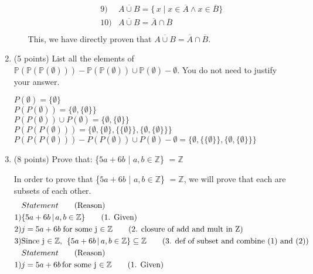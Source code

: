 \documentclass[11pt]{article}
\newcommand{\pt}[1]{\textcolor{maincolor}{(#1 points)}}
\begin{document}
\begin{justify}
\begin{enumerate}
\begin{enumerate}
\begin{mdframed}
\begin{align*}
        9) &\overline{A \cup B} = \{\, x \mid x \in \overline{A} \land x \in \overline{B}\} \tag{9. def of complement} \\
        10) &\overline{A \cup B} = \overline{A} \cap \overline{B} \tag{10. def of intersection} \\
    \end{align*}
    This, we have directly proven that $\overline{A \cup B} = \overline{A} \cap \overline{B}$.
\end{mdframed}
\end{enumerate}
\item \pt{5} List all the elements of $\mathbb{P}(\mathbb{P}(\mathbb{P}(\emptyset)))-\mathbb{P}(\mathbb{P}(\emptyset))\cup \mathbb{P}(\emptyset)-\emptyset$.
You do not need to justify your answer.
\begin{mdframed}
    $P(\emptyset) = \{\emptyset\}$ \\
    $P(P(\emptyset)) = \{ \emptyset, \{ \emptyset\}\}$ \\
    $P(P(\emptyset)) \cup P(\emptyset) = \{\emptyset, \{\emptyset\}\}$ \\
    $P(P(P(\emptyset))) = \{ \emptyset, \{ \emptyset\}, \{ \{ \emptyset\}\}, \{ \emptyset, \{ \emptyset\}\}\}$ \\
    $P(P(P(\emptyset))) - P(P(\emptyset)) \cup P(\emptyset) - \emptyset = 
    \{\emptyset,\{\{ \emptyset\}\}, \{\emptyset, \{\emptyset\}\} \}$ \\
\end{mdframed}
\item \pt{8} Prove that: \{$5a + 6b$ | $a,b \in \mathbb{Z}$\} $ = \mathbb{Z}$
\begin{mdframed}
    In order to prove that \{$5a + 6b$ | $a,b \in \mathbb{Z}$\} $ = \mathbb{Z}$, we will prove that each are subsets of each other.
    \begin{align*}
        &Statement \tag{Reason} \\
        1) &\{5a + 6b \,|\, a,b \in \mathbb{Z}\} \tag{1. Given}\\
        2) &j = 5a+6b \text{\;for some j $\in \mathbb{Z}$} \tag{2. closure of add and mult in Z}\\
        3) &\text{Since j $\in \mathbb{Z}$, }\;\{5a + 6b \,| \,a,b \in \mathbb{Z}\} \subseteq \mathbb{Z} \tag{3. def of subset and combine (1) and (2)} \\
        &Statement \tag{Reason} \\
        1) &j=5a+6b\, \text{for some j $\in \mathbb{Z}$} \tag{1. Given} \\

\end{align*}
\end{mdframed}
\end{enumerate}
\end{justify}
\end{document}
